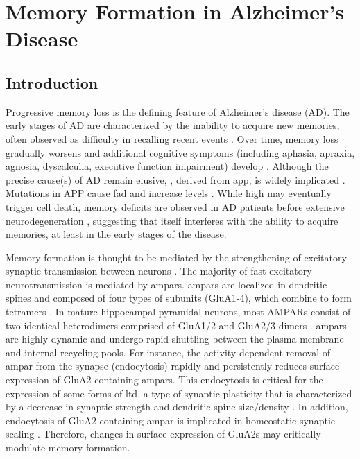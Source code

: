 \chapter{Memory Formation in Alzheimer's Disease \label{chap-ad}}
\section{Introduction}

Progressive memory loss is the defining feature of Alzheimer’s disease (AD).  The early stages of AD are characterized by the inability to acquire new memories, often observed as difficulty in recalling recent events \citep{albert96, storandt89, wilson83}. Over time, memory loss gradually worsens and additional cognitive symptoms (including aphasia, apraxia, agnosia, dyscalculia, executive function impairment) develop \citep{shah06}. Although the precise cause(s) of AD remain elusive, \abeta{}, derived from \gls{app}, is widely implicated \citep{selkoe02, tanzi01}. Mutations in APP cause \gls{fad} \citep{hardy02,price98} and increase \abeta{} levels \citep{cai93, citron92}.  While high \abeta{} may eventually trigger cell death, memory deficits are observed in AD patients before extensive neurodegeneration \citep{selkoe02}, suggesting that \abeta{} itself interferes with the ability to acquire memories, at least in the early stages of the disease.  

Memory formation is thought to be mediated by the strengthening of excitatory synaptic transmission between neurons \citep{bailey93, lamprecht04}.  The majority of fast excitatory neurotransmission is mediated by \glspl{ampar}.  \Glspl{ampar} are localized in dendritic spines and composed of four types of subunits (GluA1-4), which combine to form tetramers \citep{hollmann94}.  In mature hippocampal pyramidal neurons, most AMPARs consist of two identical heterodimers comprised of GluA1/2 and GluA2/3 dimers \citep{wenthold96}.  \Glspl{ampar} are highly dynamic and undergo rapid shuttling between the plasma membrane and internal recycling pools. For instance, the activity-dependent removal of \gls{ampar} from the synapse (endocytosis) rapidly and persistently reduces surface expression of GluA2-containing \glspl{ampar}. This endocytosis is critical for the expression of some forms of \gls{ltd}, a type of synaptic plasticity that is characterized by a decrease in synaptic strength and dendritic spine size/density \citep{collingridge04, malinow02, zhou04}. In addition, endocytosis of GluA2-containing \gls{ampar} is implicated in homeostatic synaptic scaling \citep{gainey09}. Therefore, changes in surface expression of GluA2s may critically modulate memory formation.  

